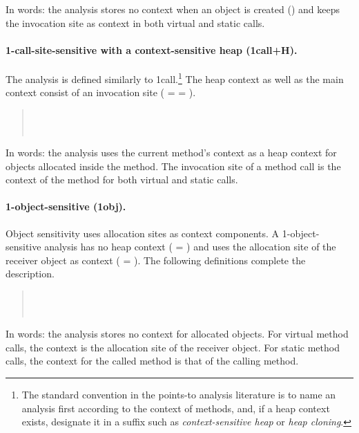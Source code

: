 In words: the analysis stores no context when an object is created () and keeps the invocation site as context in both virtual and static calls.

\paragraph*{1-call-site-sensitive with a context-sensitive heap (1call+H).}
The analysis is defined similarly to 1call.\footnote{The standard convention in the points-to analysis literature is to name an analysis first according to the context of methods, and, if a heap context exists, designate it in a suffix such as \emph{context-sensitive heap} or \emph{heap cloning}.} The heap context as well as the main context consist of an invocation site ( =  = ).

\begin{quote}
 \\
 \\
\end{quote}

In words: the analysis uses the current method's context as a heap context for objects allocated inside the method. The invocation site of a method call is the context of the method for both virtual and static calls.

\paragraph*{1-object-sensitive (1obj).}
Object sensitivity uses allocation sites as context components. A 1-object-sensitive analysis has no heap context ( = \args{\{$\star$\}}) and uses the allocation site of the receiver object as context ( = ). The following definitions complete the description. 

\begin{quote}
 \\
 \\
\end{quote}

In words: the analysis stores no context for allocated objects. For virtual method calls, the context is the allocation site of the receiver object. For static method calls, the context for the called method is that of the calling method.

